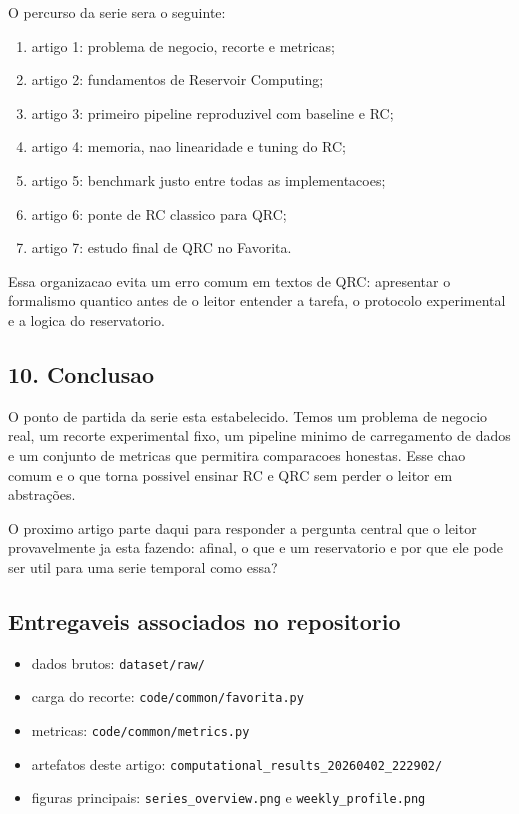 \documentclass[12pt]{article}
\providecommand{\tightlist}{%
          \setlength{\itemsep}{0pt}\setlength{\parskip}{0pt}}
\begin{document}
O percurso da serie sera o seguinte:

\begin{enumerate}
\def\labelenumi{\arabic{enumi}.}
\tightlist
\item
  artigo 1: problema de negocio, recorte e metricas;
\item
  artigo 2: fundamentos de Reservoir Computing;
\item
  artigo 3: primeiro pipeline reproduzivel com baseline e RC;
\item
  artigo 4: memoria, nao linearidade e tuning do RC;
\item
  artigo 5: benchmark justo entre todas as implementacoes;
\item
  artigo 6: ponte de RC classico para QRC;
\item
  artigo 7: estudo final de QRC no Favorita.
\end{enumerate}

Essa organizacao evita um erro comum em textos de QRC: apresentar o formalismo quantico antes de o leitor entender a tarefa, o protocolo experimental e a logica do reservatorio.

\subsection{10. Conclusao}\label{10-conclusao}

O ponto de partida da serie esta estabelecido. Temos um problema de negocio real, um recorte experimental fixo, um pipeline minimo de carregamento de dados e um conjunto de metricas que permitira comparacoes honestas. Esse chao comum e o que torna possivel ensinar RC e QRC sem perder o leitor em abstrações.

O proximo artigo parte daqui para responder a pergunta central que o leitor provavelmente ja esta fazendo: afinal, o que e um reservatorio e por que ele pode ser util para uma serie temporal como essa?

\subsection{Entregaveis associados no repositorio}\label{entregaveis-associados-no-repositorio}

\begin{itemize}
\tightlist
\item
  dados brutos: \texttt{dataset/raw/}
\item
  carga do recorte: \texttt{code/common/favorita.py}
\item
  metricas: \texttt{code/common/metrics.py}
\item
  artefatos deste artigo: \texttt{computational\_results\_20260402\_222902/}
\item
  figuras principais: \texttt{series\_overview.png} e \texttt{weekly\_profile.png}
\end{itemize}
\end{document}
